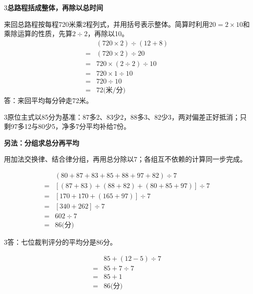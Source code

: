 \documentclass[multi=snippet,border={5bp 20bp 5bp 5bp}]{standalone}
\newenvironment{snippet}[3]{\begin{minipage}{#1bp}\color{answerred}\fontsize{#2}{#3}\selectfont\raggedright}{\end{minipage}}
\begin{document}
\begin{snippet}{505}{11.5}{14}\begin{multicols}{3}\raggedcolumns \textbf{总路程括成整体，再除以总时间}\par 来回总路程按每程720米乘2程列式，并用括号表示整体。简算时利用\(20=2\times10\)\allowbreak 和乘除运算的性质，先算\(2\div2\)\allowbreak ，再除以10。\[\begin{aligned}&(720\times2)\div(12+8)\\={}&(720\times2)\div20\\={}&720\times(2\div2)\div10\\={}&720\times1\div10\\={}&720\div10\\={}&72\text{(米/分)}\end{aligned}\]答：来回平均每分钟走72米。\end{multicols}\end{snippet}
\begin{snippet}{505}{11.5}{14}\begin{multicols}{3}\raggedcolumns 原位主式以85分为基准：87多2、83少2，88多3、82少3，两对偏差正好抵消；只剩97多12与80少5，净多7分平均补给7份。\par\textbf{另法：分组求总分再平均}\par 用加法交换律、结合律分组，再用总分除以7；各组互不依赖的计算同一步完成。\end{multicols}\[\begin{aligned}&(80+87+83+85+88+97+82)\div7\\={}&[(87+83)+(88+82)+(80+85+97)]\div7\\={}&[170+170+(165+97)]\div7\\={}&[340+262]\div7\\={}&602\div7\\={}&86\text{(分)}\end{aligned}\]\begin{multicols}{3}\raggedcolumns 答：七位裁判评分的平均分是86分。\end{multicols}\end{snippet}
\begin{snippet}{189}{9.0}{12.8}\SourceSans\setlength{\mathindent}{2bp}\[\begin{aligned}&85+(12-5)\div7\\={}&85+7\div7\\={}&85+1\\={}&86\text{(分)}\end{aligned}\]\end{snippet}
\end{document}
